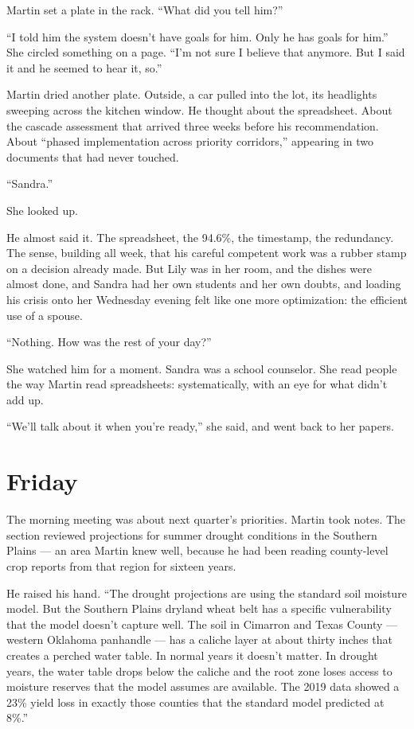 \documentclass[11pt]{article}
\begin{document}
Martin set a plate in the rack. ``What did you tell him?''

``I told him the system doesn't have goals for him. Only he has goals for him.'' She circled something on a page. ``I'm not sure I believe that anymore. But I said it and he seemed to hear it, so.''

Martin dried another plate. Outside, a car pulled into the lot, its headlights sweeping across the kitchen window. He thought about the spreadsheet. About the cascade assessment that arrived three weeks before his recommendation. About ``phased implementation across priority corridors,'' appearing in two documents that had never touched.

``Sandra.''

She looked up.

He almost said it. The spreadsheet, the 94.6\%, the timestamp, the redundancy. The sense, building all week, that his careful competent work was a rubber stamp on a decision already made. But Lily was in her room, and the dishes were almost done, and Sandra had her own students and her own doubts, and loading his crisis onto her Wednesday evening felt like one more optimization: the efficient use of a spouse.

``Nothing. How was the rest of your day?''

She watched him for a moment. Sandra was a school counselor. She read people the way Martin read spreadsheets: systematically, with an eye for what didn't add up.

``We'll talk about it when you're ready,'' she said, and went back to her papers.

\section*{Friday}

The morning meeting was about next quarter's priorities. Martin took notes. The section reviewed projections for summer drought conditions in the Southern Plains --- an area Martin knew well, because he had been reading county-level crop reports from that region for sixteen years.

He raised his hand. ``The drought projections are using the standard soil moisture model. But the Southern Plains dryland wheat belt has a specific vulnerability that the model doesn't capture well. The soil in Cimarron and Texas County --- western Oklahoma panhandle --- has a caliche layer at about thirty inches that creates a perched water table. In normal years it doesn't matter. In drought years, the water table drops below the caliche and the root zone loses access to moisture reserves that the model assumes are available. The 2019 data showed a 23\% yield loss in exactly those counties that the standard model predicted at 8\%.''
\end{document}
